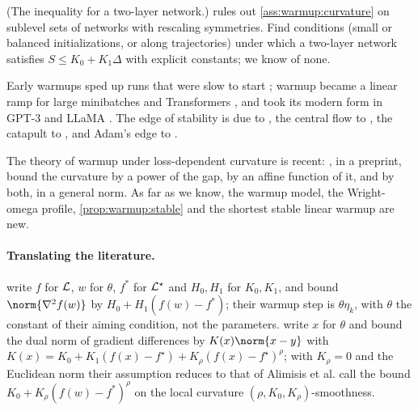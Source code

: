 \begin{refsection}
\begin{exercises}
\item \research (The inequality for a two-layer network.)  rules out \cref{ass:warmup:curvature} on sublevel sets of networks with rescaling symmetries. Find conditions (small or balanced initializations, or along trajectories) under which a two-layer network satisfies $S\le K_0+K_1\Delta$ with explicit constants; we know of none.\label{ex:warmup:twolayer}

\end{exercises}

\notesandrefs
Early warmups sped up runs that were slow to start \parencite{HeEtAl2016}; warmup became a linear ramp for large minibatches \parencite{GoyalEtAl2017} and Transformers \parencite{VaswaniEtAl2017}, and took its modern form in GPT-3 and LLaMA \parencite{BrownEtAl2020,TouvronEtAl2023}. The edge of stability is due to \textcite{CohenEtAl2021}, the central flow to \textcite{CohenEtAl2025}, the catapult to \textcite{LewkowyczEtAl2020}, and Adam's edge to \textcite{CohenEtAl2022}.

The theory of warmup under loss-dependent curvature is recent: \textcite{LiuEtAl2025Warmup}, in a preprint, bound the curvature by a power of the gap, \textcite{AlimisisIslamovLucchi2026} by an affine function of it, and \textcite{RiabininEtAl2026} by both, in a general norm. As far as we know, the warmup model, the Wright-omega profile, \cref{prop:warmup:stable} and the shortest stable linear warmup are new.

\paragraph{Translating the literature.} \Textcite{AlimisisIslamovLucchi2026} write $f$ for $\mathcal{L}$, $w$ for $\theta$, $f^*$ for $\mathcal{L}^\star$ and $H_0,H_1$ for $K_0,K_1$, and bound $\norm{\nabla^2f(w)}$ by $H_0+H_1(f(w)-f^*)$; their warmup step is $\theta\eta_k$, with $\theta$ the constant of their aiming condition, not the parameters. \Textcite{RiabininEtAl2026} write $x$ for $\theta$ and bound the dual norm of gradient differences by $K(x)\norm{x-y}$ with $K(x)=K_0+K_1(f(x)-f^\star)+K_\rho(f(x)-f^\star)^\rho$; with $K_\rho=0$ and the Euclidean norm their assumption reduces to that of Alimisis et al. \Textcite{LiuEtAl2025Warmup} call the bound $K_0+K_\rho(f(w)-f^*)^\rho$ on the local curvature $(\rho,K_0,K_\rho)$-smoothness.

\printchapterbib
\end{refsection}
